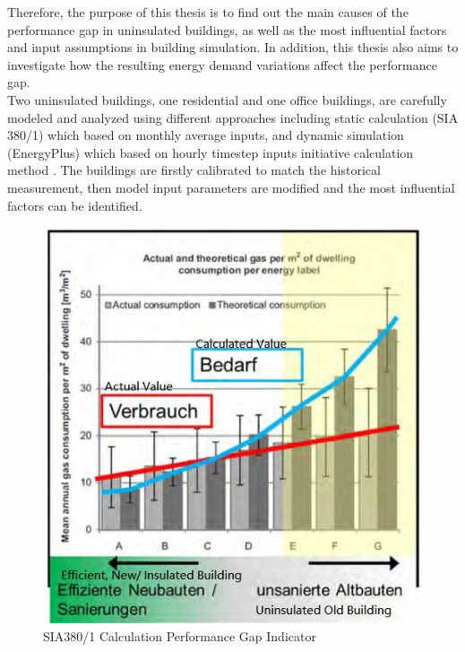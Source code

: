 \documentclass[a4paper, oneside]{discothesis}
\begin{document}
	
	Therefore, the purpose of this thesis is to find out the main causes of the performance gap in uninsulated buildings, as well as the most influential factors and input assumptions in building simulation. In addition, this thesis also aims to investigate how the resulting energy demand variations affect the performance gap.\\


	Two uninsulated buildings, one residential and one office buildings, are carefully modeled and analyzed using different approaches including static calculation (SIA 380/1) which based on monthly average inputs, and dynamic simulation (EnergyPlus) which based on hourly timestep inputs initiative calculation method \cite{SIAPreviousreport,SIA2024Shop,crawley2000energy}. The buildings are firstly calibrated to match the historical measurement, then model input parameters are modified and the most influential factors can be identified.\\

		\begin{figure}[!ht]
		\centering
		\includegraphics[scale=0.65]{SIA380Issue.jpg}
		\caption{SIA380/1 Calculation Performance Gap Indicator \cite{SIAPreviousreport}}
		\label{fig:SIA380PG}
		\end{figure}
\end{document}
